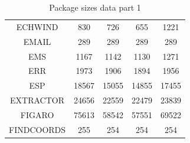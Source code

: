 \documentclass[twoside,11pt]{article}
\renewcommand{\_}{\texttt{\symbol{95}}}
\begin{document}
\begin{table}[ht]
\begin{center}
\begin{tabular}{|c|c|c|c|c|}
ECHWIND & 830 & 726 & 655 & 1221 \\
EMAIL & 289 & 289 & 289 & 289 \\
EMS & 1167 & 1142 & 1130 & 1271 \\
ERR & 1973 & 1906 & 1894 & 1956 \\
ESP & 18567 & 15055 & 14855 & 17455 \\
EXTRACTOR & 24656 & 22559 & 22479 & 23839 \\
FIGARO & 75613 & 58542 & 57551 & 69522 \\
FINDCOORDS & 255 & 254 & 254 & 254 \\
\hline
\end{tabular}
\caption{Package sizes data part 1}
\end{center}
\end{table}
\end{document}
